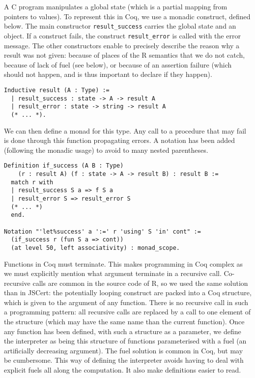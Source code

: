 \documentclass{article}
\newcommand\Coq{Coq}
\newcommand\R{R}
\newcommand\Cn{C}
\begin{document}
A \Cn{} program manipulates a global state
(which is a partial mapping from pointers to values).
To represent this in \Coq{}, we use a monadic construct, defined below.
The main constructor \texttt{result_success}
carries the global state and an object.
If a construct fails,
the construct \texttt{result_error}
is called with the error message.
The other constructors enable to precisely describe
the reason why a result was not given:
because of places of the \R{} semantics that we do not catch,
because of lack of fuel (see below),
or because of an assertion failure
(which should not happen,
and is thus important to declare if they happen).
\begin{verbatim}
Inductive result (A : Type) :=
  | result_success : state -> A -> result A
  | result_error : state -> string -> result A
  (* ... *).
\end{verbatim}

We can then define a monad for this type.
Any call to a procedure that may fail
is done through this function
propagating errors.
A notation has been added
(following the monadic usage)
to avoid to many nested parentheses.
\begin{verbatim}
Definition if_success (A B : Type)
    (r : result A) (f : state -> A -> result B) : result B :=
  match r with
  | result_success S a => f S a
  | result_error S => result_error S
  (* ... *)
  end.

Notation "'let%success' a ':=' r 'using' S 'in' cont" :=
  (if_success r (fun S a => cont))
  (at level 50, left associativity) : monad_scope.
\end{verbatim}

Functions in \Coq{} must terminate.
This makes programming in \Coq{} complex as we must explicitly
mention what argument terminate in a recursive call.
Co-recursive calls are common in the source code of \R{},
so we used the same solution than in JSCert:
the potentially looping construct are packed into a \Coq{}
structure, which is given to the argument of any function.
There is no recursive call in such a programming pattern:
all recursive calls are replaced by a call to one element
of the structure (which may have the same name than the
current function).
Once any function has been defined,
with such a structure as a parameter,
we define the interpreter as being this structure of functions
parameterised with a fuel (an artificially decreasing argument).
The fuel solution is common in \Coq{},
but may be cumbersome.
This way of defining the interpreter avoids
having to deal with explicit fuels all along the computation.
It also make definitions easier to read.
\end{document}
